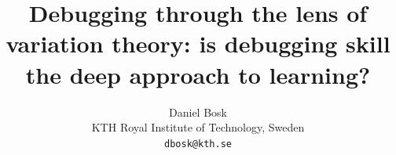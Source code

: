 \documentclass[a4paper,10pt,article,oneside,oldfontcommands]{memoir}
\title{%
  Debugging through the lens of variation theory:
  is debugging skill the deep approach to learning?%
}
\author{%
  Daniel Bosk
  \\KTH Royal Institute of Technology, Sweden
  \\\texttt{dbosk@kth.se}
}
\begin{document}
\maketitle
\begin{abstract}
  
\end{abstract}

\clearpage
\tableofcontents
\clearpage














\printbibliography

\appendix





\end{document}
